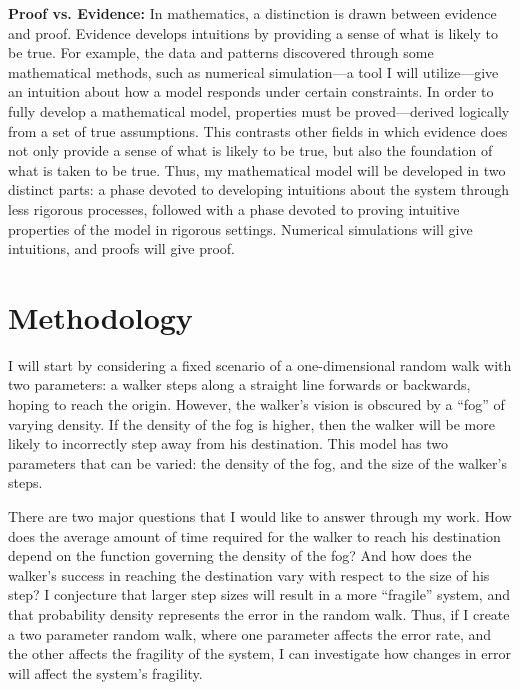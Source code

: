 \documentclass[12pt,letterpaper]{article}
\begin{document}
    \textbf{Proof vs. Evidence:} In mathematics, a distinction is drawn between evidence and proof.
    Evidence develops intuitions by providing a sense of what is likely to be true. For example, the
    data and patterns discovered through some mathematical methods, such as numerical simulation---a
    tool I will utilize---give an intuition about how a model responds under certain constraints. In
    order to fully develop a mathematical model, properties must be proved---derived logically from a
    set of true assumptions. This contrasts other fields in which evidence does not only provide a sense
    of what is likely to be true, but also the foundation of what is taken to be true. Thus, my
    mathematical model will be developed in two distinct parts: a phase devoted to developing intuitions
    about the system through less rigorous processes, followed with a phase devoted to proving intuitive
    properties of the model in rigorous settings. Numerical simulations will give intuitions, and proofs
    will give proof.

    \section*{Methodology}
    I will start by considering a fixed scenario of a one-dimensional random walk with two parameters: a
    walker steps along a straight line forwards or backwards, hoping to reach the origin. However, the
    walker's vision is obscured by a ``fog'' of varying density. If the density of the fog is higher,
    then the walker will be more likely to incorrectly step away from his destination. This model has
    two parameters that can be varied: the density of the fog, and the size of the walker's steps.

    There are two major questions that I would like to answer through my work. How does the average
    amount of time required for the walker to reach his destination depend on the function governing the
    density of the fog? And how does the walker's success in reaching the destination vary with respect
    to the size of his step? I conjecture that larger step sizes will result in a more ``fragile''
    system, and that probability density represents the error in the random walk. Thus, if I create a
    two parameter random walk, where one parameter affects the error rate, and the other affects the
    fragility of the system, I can investigate how changes in error will affect the system's fragility.
\end{document}
